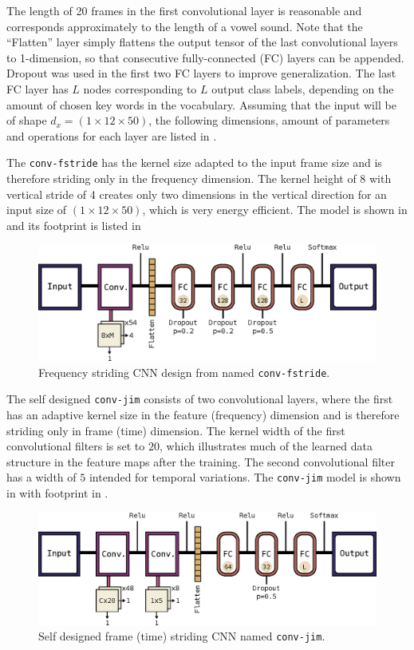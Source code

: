 The length of 20 frames in the first convolutional layer is reasonable and corresponds approximately to the length of a vowel sound.
Note that the \enquote{Flatten} layer simply flattens the output tensor of the last convolutional layers to 1-dimension, so that consecutive fully-connected (FC) layers can be appended.
Dropout was used in the first two FC layers to improve generalization.
The last FC layer has $L$ nodes corresponding to $L$ output class labels, depending on the amount of chosen key words in the vocabulary.
Assuming that the input will be of shape $d_x = (1 \times 12 \times 50)$, the following dimensions, amount of parameters and operations for each layer are listed in .


The \texttt{conv-fstride} has the kernel size adapted to the input frame size and is therefore striding only in the frequency dimension.
The kernel height of 8 with vertical stride of 4 creates only two dimensions in the vertical direction for an input size of $(1 \times 12 \times 50)$, which is very energy efficient.
The model is shown in  and its footprint is listed in 
\begin{figure}[!ht]
  \centering
    \includegraphics[height=0.2\textwidth]{./4_nn/figs/nn_arch_cnn_fstride.eps}
  \caption{Frequency striding CNN design from \cite{Sainath2015} named \texttt{conv-fstride}.}
  \label{fig:nn_arch_cnn_fstride}
\end{figure}
\FloatBarrier
\noindent


The self designed \texttt{conv-jim} consists of two convolutional layers, where the first has an adaptive kernel size in the feature (frequency) dimension and is therefore striding only in frame (time) dimension.
The kernel width of the first convolutional filters is set to $20$, which illustrates much of the learned data structure in the feature maps after the training.
The second convolutional filter has a width of $5$ intended for temporal variations.
The \texttt{conv-jim} model is shown in  with footprint in .
\begin{figure}[!ht]
  \centering
    \includegraphics[height=0.2\textwidth]{./4_nn/figs/nn_arch_cnn_conv-jim.eps}
  \caption{Self designed frame (time) striding CNN named \texttt{conv-jim}.}
  \label{fig:nn_arch_cnn_conv-jim}
\end{figure}
\FloatBarrier
\noindent


